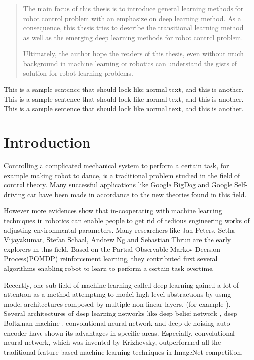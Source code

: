 \documentclass[officiallayout]{tktla}
\begin{document}
\begin{abstract}
The main focus of this thesis is to introduce general learning methods for robot control problem with an emphasize on deep learning method. As a consequence, this thesis tries to describe the transitional learning method as well as the emerging deep learning methods for robot control problem.

Ultimately, the author hope the readers of this thesis, even without much background in machine learning or robotics can understand the gists of solution for robot learning problems. 
\end{abstract}

\begin{acknowledgements}
  This is a sample sentence that should look like normal text, and
  this is another. This is a sample sentence that should look like
  normal text, and this is another. This is a sample sentence that
  should look like normal text, and this is another.
\end{acknowledgements}

\tableofcontents

\mainmatter
\chapter{Introduction}

Controlling a complicated mechanical system to perform a certain task, for example making robot to dance, is a traditional problem studied in the field of control theory. Many successful applications like Google BigDog\cite{Raibert2008} and Google Self-driving car \cite{Guizzo2011a} have been made in accordance to the new theories found in this field.

However more evidences show that in-cooperating with machine learning techniques in robotics can enable people to get rid of tedious engineering works of adjusting environmental parameters. Many researchers like Jan Peters, Sethu Vijayakumar, Stefan Schaal, Andrew Ng and Sebastian Thrun are the early explorers in this field. Based on the Partial Observable Markov Decision Process(POMDP) reinforcement learning, they contributed first several algorithms enabling robot to learn to perform a certain task overtime.

Recently, one sub-field of machine learning called deep learning gained a lot of attention as a method attempting to model high-level abstractions by using model architectures composed by multiple non-linear layers. (for example \cite{Krizhevsky2012}). Several architectures of deep learning networks like deep belief network \cite{Hinton2006}, deep Boltzman machine \cite{Salakhutdinov2009}, convolutional neural network \cite{Krizhevsky2012} and deep de-noising auto-encoder \cite{Vincent2010} have shown its advantages in specific areas. Especially, convolutional neural network, which was invented by Krizhevsky, outperformed all the traditional feature-based machine learning techniques in ImageNet competition.
\end{document}
